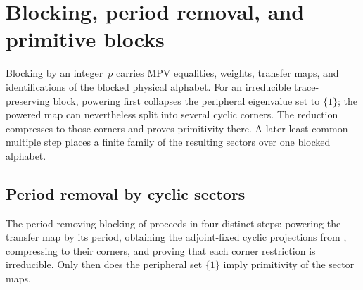 \section{Blocking, period removal, and primitive blocks}%
\label{sec:blocking_infrastructure}

Blocking by an integer~$p$ carries MPV equalities, weights, transfer maps, and
identifications of the blocked physical alphabet. For an irreducible
trace-preserving block, powering first collapses the peripheral eigenvalue set
to $\{1\}$; the powered map can nevertheless split into several cyclic corners.
The reduction compresses to those corners and proves primitivity there. A later
least-common-multiple step places a finite family of the resulting sectors over
one blocked alphabet.

\subsection{Period removal by cyclic sectors}%
\label{sec:cyclic_sectors}

The period-removing blocking of
\cite[Section~2.3]{Cirac2016MPDO_arXiv} proceeds in four distinct steps:
powering the transfer map by its period, obtaining the adjoint-fixed cyclic
projections from \cite[Theorem~6.6]{Wolf2012Quantum}, compressing to their
corners, and proving that each corner restriction is irreducible. Only then
does the peripheral set $\{1\}$ imply primitivity of the sector maps.

